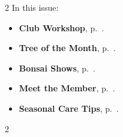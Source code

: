 \setlength{\columnsep}{-5.0cm}
\begin{multicols}{2}
    \noindent\textsf{In this issue:}
    \begin{itemize}
        \item \textsf{\textbf{Club Workshop}}, p.~\pageref{2025-09-workshop}.
        \item \textsf{\textbf{Tree of the Month}}, p.~\pageref{2025-09-contest}.
        \item \textsf{\textbf{Bonsai Shows}}, p.~\pageref{2025-09-show}.
        \item \textsf{\textbf{Meet the Member}}, p.~\pageref{2025-09-roots}.
        \item \textsf{\textbf{Seasonal Care Tips}}, p.~\pageref{2025-09-care}.
    \end{itemize}
    \vfill\null
    \columnbreak

    
\end{multicols}
\pagebreak

\setlength{\columnsep}{0.5cm}
\begin{multicols}{2}
    
    
%    
%    
%    
    
    
    
%    
\end{multicols}
